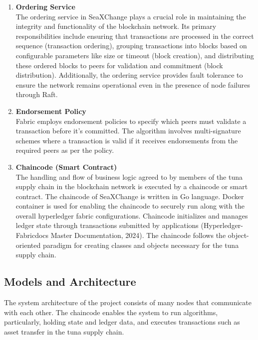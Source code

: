 \begin{enumerate}
		\item \textbf{Ordering Service} \\ The ordering service in SeaXChange plays a crucial role in maintaining the integrity and functionality of the blockchain network. Its primary responsibilities include ensuring that transactions are processed in the correct sequence (transaction ordering), grouping transactions into blocks based on configurable parameters like size or timeout (block creation), and distributing these ordered blocks to peers for validation and commitment (block distribution). Additionally, the ordering service provides fault tolerance to ensure the network remains operational even in the presence of node failures through Raft.
		
		\item \textbf{Endorsement Policy} \\Fabric employs endorsement policies to specify which peers must validate a transaction before it's committed. The algorithm involves multi-signature schemes where a transaction is valid if it receives endorsements from the required peers as per the policy.
		
		\item \textbf{Chaincode (Smart Contract)} \\The handling and flow of business logic agreed to by members of the tuna supply chain in the blockchain network is executed by a chaincode or smart contract. The chaincode of SeaXChange is written in Go language. Docker container is used for enabling the chaincode to securely run along with the overall hyperledger fabric configurations. Chaincode initializes and manages ledger state through transactions submitted by applications (Hyperledger-Fabricdocs Master Documentation, 2024). The chaincode follows the object-oriented paradigm for creating classes and objects necessary for the tuna supply chain.
		
		
	\end{enumerate}

\subsection{Models and Architecture}
The system architecture of the project consists of many nodes that communicate with each other. The chaincode enables the system to run algorithms, particularly, holding state and ledger data, and executes transactions such as asset transfer in the tuna supply chain. 

